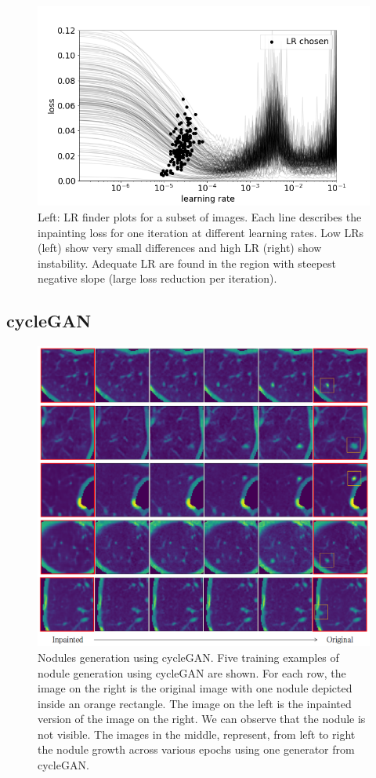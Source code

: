 \documentclass[runningheads]{llncs}
\begin{document}
\begin{figure}
\includegraphics[width=\textwidth]{learning-rate.png}
\caption{Left: LR finder plots for a subset of images. Each line describes the inpainting loss for one iteration at different learning rates. Low LRs (left) show very small differences and high LR (right) show instability. Adequate LR are found in the region with steepest negative slope (large loss reduction per iteration).  } \label{fig2}
\end{figure}

\subsection{cycleGAN}

\begin{figure}
\includegraphics[width=\textwidth]{cycleGAN-nodule-generator.png}
\caption{Nodules generation using cycleGAN. Five training examples of nodule generation using cycleGAN are shown. For each row, the image on the right is the original image with one nodule depicted inside an orange rectangle. The image on the left is the inpainted version of the image on the right. We can observe that the nodule is not visible. The images in the middle, represent, from left to right the nodule growth across various epochs using one generator from cycleGAN.} \label{fig3}
\end{figure}
\end{document}
